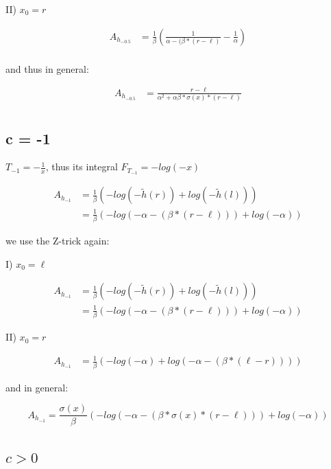 \documentclass[]{article}
\begin{document}
II) $x_0 = r$

\begin{align*}
A_{h_{-0.5}} & = \frac{1}{\beta} \left(\frac{1}{\alpha - (\beta * (r - \ell)} - \frac{1}{\alpha} \right) \\
\end{align*}

and thus in general:

\begin{align*}
	A_{h_{-0.5}} & = \frac{r - \ell}{\alpha^2 + \alpha \beta * \sigma(x) * (r - \ell)}\\
\end{align*}







\subsection{c = -1}

$T_{-1} = -\frac{1}{x}$, thus its integral $F_{T_{-1}} = - log(-x)$

\begin{align*}
	A_{h_{-1}} &= \frac{1}{\beta} \left(-log(-\tilde{h}(r)) + log(-\tilde{h}(l)) \right) \\
&= \frac{1}{\beta} \left(-log(-\alpha - (\beta * (r - \ell))) + log(-\alpha) \right)
\end{align*}

we use the Z-trick again:

I) $x_0 = \ell$

\begin{align*}
	A_{h_{-1}} &= \frac{1}{\beta} \left(-log(-\tilde{h}(r)) + log(-\tilde{h}(l)) \right) \\
&= \frac{1}{\beta} \left(-log(-\alpha - (\beta * (r - \ell))) + log(-\alpha) \right)
\end{align*}

II) $x_0 = r$

\begin{align*}
A_{h_{-1}} &= \frac{1}{\beta} \left(- log(-\alpha) + log(-\alpha - (\beta * (\ell - r))) \right)
\end{align*}


and in general:

\[
	A_{h_{-1}} = \frac{\sigma(x)}{\beta} \left(-log(-\alpha - (\beta * \sigma(x) * (r - \ell))) + log(-\alpha) \right)
\]


\subsection{$c > 0$}
\end{document}
